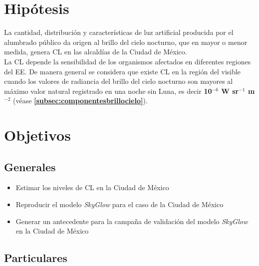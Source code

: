 \section{Hipótesis}

\vspace{5mm}

La cantidad, distribución y características de luz artificial producida por el alumbrado público da origen al brillo del cielo nocturno, que en mayor o menor medida, genera CL en las alcaldías de la Ciudad de México.\\

La CL depende la sensibilidad de los organismos afectados en diferentes regiones del EE. De manera general se considera que existe CL en la región del visible cuando los valores de radiancia del brillo del cielo nocturno son mayores al máximo valor natural registrado en una noche sin Luna, es decir \textbf{10$^{-6}$ W sr$^{-1}$  m$^{-2}$} (véase \textbf{\autoref{subsec:componentesbrillocielo}}).\\


\section{Objetivos}

\vspace{5mm}

\subsection{Generales}

\vspace{5mm}

\begin{itemize}

	\item Estimar los niveles de CL en la Ciudad de México 

    \item Reproducir el modelo \textit{SkyGlow} para el caso de la Ciudad de México
    
    \item Generar un antecedente para la campaña de validación del modelo \textit{SkyGlow} en la Ciudad de México
    
\end{itemize}

\vspace{5mm}

\subsection{Particulares}

